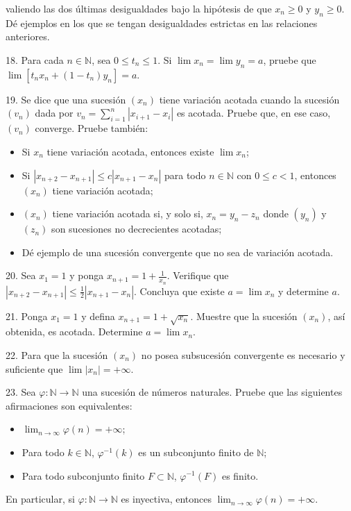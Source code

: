 \documentclass[12pt,oneside]{book}
\begin{document}
valiendo las dos últimas desigualdades bajo la hipótesis de que \(x_n \ge 0\) y \(y_n \ge 0\). Dé ejemplos en los que se tengan desigualdades estrictas en las relaciones anteriores.

18. Para cada \(n \in \mathbb{N}\), sea \(0 \le t_n \le 1\). Si \(\lim x_n = \lim y_n = a\), pruebe que \(\lim [t_n x_n + (1 - t_n) y_n] = a\).

19. Se dice que una sucesión \((x_n)\) tiene variación acotada cuando la sucesión \((v_n)\) dada por \(v_n = \sum_{i=1}^n |x_{i+1} - x_i|\) es acotada.  
Pruebe que, en ese caso, \((v_n)\) converge. Pruebe también:
\begin{itemize}
    \item[a)] Si \(x_n\) tiene variación acotada, entonces existe \(\lim x_n\);\\
    \item[b)] Si \(|x_{n+2} - x_{n+1}| \leq c|x_{n+1} - x_n|\) para todo \(n \in \mathbb{N}\) con \(0 \leq c < 1\), entonces \((x_n)\) tiene variación acotada;\\
    \item[c)] \((x_n)\) tiene variación acotada si, y solo si, \(x_n = y_n - z_n\) donde \((y_n)\) y \((z_n)\) son sucesiones no decrecientes acotadas;\\
    \item[d)] Dé ejemplo de una sucesión convergente que no sea de variación acotada.
\end{itemize}

20. Sea \(x_1 = 1\) y ponga \(x_{n+1} = 1 + \frac{1}{x_n}\). Verifique que \(|x_{n+2} - x_{n+1}| \leq \frac{1}{2}|x_{n+1} - x_n|\). Concluya que existe \(a = \lim x_n\) y determine \(a\).

21. Ponga \(x_1 = 1\) y defina \(x_{n+1} = 1 + \sqrt{x_n}\). Muestre que la sucesión \((x_n)\), así obtenida, es acotada. Determine \(a = \lim x_n\).

22. Para que la sucesión \((x_n)\) no posea subsucesión convergente es necesario y suficiente que \(\lim |x_n| = +\infty\).

23. Sea \(\varphi: \mathbb{N} \to \mathbb{N}\) una sucesión de números naturales. Pruebe que las siguientes afirmaciones son equivalentes:
\begin{itemize}
    \item[a)] \(\lim_{n \to \infty} \varphi(n) = +\infty\);\\
    \item[b)] Para todo \(k \in \mathbb{N}\), \(\varphi^{-1}(k)\) es un subconjunto finito de \(\mathbb{N}\);\\
    \item[c)] Para todo subconjunto finito \(F \subset \mathbb{N}\), \(\varphi^{-1}(F)\) es finito.
\end{itemize}
En particular, si \(\varphi: \mathbb{N} \to \mathbb{N}\) es inyectiva, entonces \(\lim_{n \to \infty} \varphi(n) = +\infty\).
\end{document}
